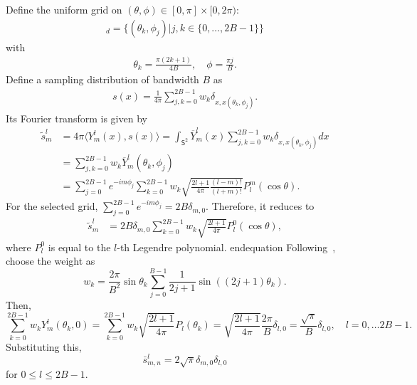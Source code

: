 \documentclass[onecolumn,11pt]{IEEEtran}
\newcommand{\pair}[1]{\ensuremath{\langle #1 \rangle}}
\newcommand{\Sph}{\ensuremath{\mathsf{S}}}
\begin{document}
Define the uniform grid on $(\theta,\phi)\in[0,\pi]\times [0, 2\pi)$:
\begin{align*}
    [\Sph^2]_d = \{(\theta_k,\phi_j)| j,k\in\{0,\ldots, 2B-1\}\}
\end{align*}
with
\begin{align*}
    \theta_k = \frac{\pi(2k+1)}{4B}, \quad \phi = \frac{\pi j}{B}.
\end{align*}
Define a sampling distribution of bandwidth $B$ as
\begin{align*}
    s(x) = \frac{1}{4\pi} \sum_{j,k=0}^{2B-1} w_k \delta_{x,x(\theta_k,\phi_j)}.
\end{align*}
Its Fourier transform is given by
\begin{align*}
    \tilde s^l_m & = 4\pi \pair{  Y^l_m(x), s(x) } = \int_{\Sph^2} \overline{Y}^l_m(x) \sum_{j,k=0}^{2B-1} w_k \delta_{x,x(\theta_k,\phi_j)} dx\\
                 & = \sum_{j,k=0}^{2B-1} w_k \overline{Y}^l_m(\theta_k,\phi_j)\\
                 & = \sum_{j=0}^{2B-1} e^{-im\phi_j} \sum_{k=0}^{2B-1} w_k \sqrt{\frac{2l+1}{4\pi}\frac{(l-m)!}{(l+m)!}} P^m_l(\cos\theta).
\end{align*}
For the selected grid, $\sum_{j=0}^{2B-1} e^{-im\phi_j}= 2B \delta_{m,0}$. 
Therefore, it reduces to
\begin{align*}
    \tilde s^l_m & = 2B\delta_{m,0} \sum_{k=0}^{2B-1} w_k \sqrt{\frac{2l+1}{4\pi}} P^0_l(\cos\theta),
\end{align*}
where $P^0_l$ is equal to the $l$-th Legendre polynomial. 
end{equation}
Following~\cite{DriHeaAAM94}, choose the weight as
\begin{equation}
    w_k = \frac{2\pi}{B^2}\sin\theta_k \sum_{j=0}^{B-1} \frac{1}{2j+1}\sin((2j+1)\theta_k).
\end{equation}
Then,
\begin{equation}
    \sum_{k=0}^{2B-1} w_k Y^l_m(\theta_k,0) = \sum_{k=0}^{2B-1} w_k \sqrt{\frac{2l+1}{4\pi}} P_l(\theta_k) =\sqrt{\frac{2l+1}{4\pi}} \frac{2\pi}{B} \delta_{l,0}=\frac{\sqrt{\pi}}{B} \delta_{l,0},\quad l=0,\ldots 2B-1.
\end{equation}
Substituting this,
\begin{equation}
    \bar s ^l_{m,n} = 2\sqrt{\pi}\delta_{m,0}\delta_{l,0}
\end{equation}
for $0\leq l\leq 2B-1$. 
\end{document}
